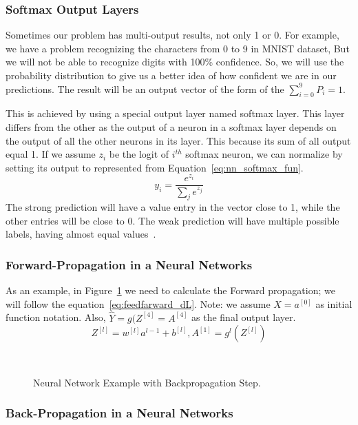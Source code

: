 \subsubsection{Softmax Output Layers}
Sometimes our problem has multi-output results, not only 1 or 0. For example, we have a problem recognizing the characters from 0 to 9 in MNIST dataset, But we will not be able to recognize digits with 100\% confidence. So, we will use the probability distribution to give us a better idea of how confident we are in our predictions. The result will be an output vector of the form of the $\sum_{i = 0}^9P_i=1$.

This is achieved by using a special output layer named softmax layer. This layer differs from the other as the output of a neuron in a softmax layer depends on the output of all the other neurons in its layer. This because its sum of all output equal 1. If we assume $z_i$ be the logit of $i^{th}$ softmax neuron, we can normalize by setting its output to represented from Equation~\eqref{eq:nn_softmax_fun}.%
\begin{equation}\label{eq:nn_softmax_fun}
 y_i=\frac{e^{z_i}}{\sum_je^{z_j}}
\end{equation}
%
The strong prediction will have a value entry in the vector close to 1, while the other entries will be close to 0. The weak prediction will have multiple possible labels, having almost equal values~\cite{DLFundamentals}.

\subsubsection{Forward-Propagation in a Neural Networks}
As an example, in Figure~\ref{Fig:NN_With_BP} we need to calculate the Forward propagation; we will follow the equation~\eqref{eq:feedfarward_dL}. Note: we assume $X = a^{[0]}$ as initial function notation. Also, $\widehat{Y}= g(Z^{[4]}=A^{[4]}$ as the final output layer.%
\begin{equation}\label{eq:feedfarward_dL}
Z^{[l]} = w^{[l]} a^{l-1} + b^{[l]} , A^{[1]} = g^{l}(Z^{[l]})
\end{equation} %

\begin{figure}[t]

\caption{Neural Network Example with Backpropagation Step.}~\label{Fig:NN_With_BP}
\end{figure}%
\subsubsection{Back-Propagation in a Neural Networks}

